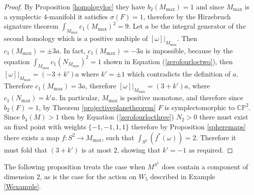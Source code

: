 \documentclass[12pt]{article}
\begin{document}
\begin{proof}
By Proposition \ref{homologyloc} they have $b_{2}(M_{\max})=1$ and since $M_{\max}$ is a symplectic $4$-manifold it satisfies $\sigma(F)=1$, therefore by the Hirzebruch signature theorem $\int_{M_{\max}} c_{1}(M_{\max})^2 = 9.$ Let $a$ be the integral generator of the second homology which is a positive multiple of $[\omega]|_{M_{\max}}$. Then $c_{1}(M_{\max}) = \pm 3a$. In fact, $c_{1}(M_{\max})=-3a$ is impossible, because by the equation $\int_{M_{\max}} c_{1}(N_{M_{\max}})^2 =1$ shown in Equation (\ref{zerofourloctwo}), then $[\omega]|_{M_{\max}} = (-3 + k')a$ where $k'=\pm1$ which contradicts the definition of $a$. Therefore $c_{1}(M_{\max})=3a$, therefore $[\omega]|_{M_{\max}} = (3 + k')a$, where $c_{1}(N_{\max})=k'a$. In particular, $M_{\max}$ is positive monotone, and therefore since $b_{2}(F)=1$, by Theorem \ref{projectiveplanetheorem} $F$ is symplectomorphic to $\mathbb{CP}^2$. Since $b_{4}(M)>1$ then by Equation (\ref{zerofourlocthree}) $N_{2}>0$ there must exist an fixed point with weights $\{-1,-1,1,1\}$ therefore by Proposition \ref{spheremaps} there exists a map  $f: S^2 \rightarrow M_{\max}$, such that $\int_{S^2} (f^{*}(\omega) ) = 2$. Therefore it must fold that $(3+k')$ is at most $2$, showing that $k'=-1$ as required.
\end{proof}
The following proposition treats the case when $M^{S^1}$ does contain a component of dimension $2$, as is the case for the action on $W_{5}$ described in Example \ref{Wexample}.
\end{document}
